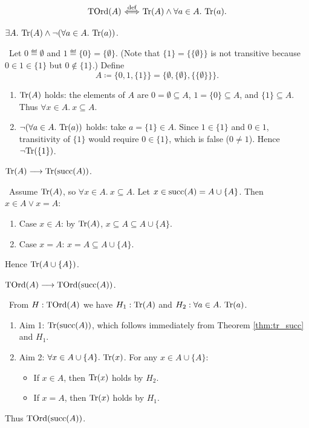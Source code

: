 \documentclass[10pt,a4paper]{article}
\begin{document}
\begin{definition}
$${\textrm{TOrd}}(A) {\stackrel{{\textrm{def}}}{\ \Longleftrightarrow\ }} {\textrm{Tr}}(A)\land \forall a\in A.\ {\textrm{Tr}}(a).$$
\end{definition}

\begin{theorem}
$\exists A.\ {\textrm{Tr}}(A) \land \neg (\forall a\in A.\ {\textrm{Tr}}(a))$.
\end{theorem}
\myprf\ Let $0 \eqdef \emptyset$ and $1 \eqdef \{0\} = \{\emptyset\}$. (Note that $\{1\} = \{\{\emptyset\}\}$ is not transitive because $0 \in 1 \in \{1\}$ but $0 \notin \{1\}$.) Define
$$A \coloneqq \{0, 1, \{1\}\} = \{\emptyset, \{\emptyset\}, \{\{\emptyset\}\}\}.$$
\begin{enumerate}
\item ${\textrm{Tr}}(A)$ holds: the elements of $A$ are $0 = \emptyset \subseteq A$, $1 = \{0\} \subseteq A$, and $\{1\} \subseteq A$. Thus $\forall x \in A.\ x \subseteq A$.
\item $\neg (\forall a \in A.\ \Tr(a))$ holds: take $a = \{1\} \in A$. Since $1 \in \{1\}$ and $0 \in 1$, transitivity of $\{1\}$ would require $0 \in \{1\}$, which is false ($0 \neq 1$). Hence $\neg {\textrm{Tr}}(\{1\})$.
\end{enumerate}
\myqed

\begin{theorem}\label{thm:tr_succ}
${\textrm{Tr}}(A) \longrightarrow {\textrm{Tr}}({\textrm{succ}}(A))$.
\end{theorem}
\myprf\ Assume ${\textrm{Tr}}(A)$, so $\forall x\in A.\ x\subseteq A$. Let $x \in {\textrm{succ}}(A) = A\cup\{A\}$. Then $x\in A \lor x=A$:
\begin{enumerate}
\item Case $x\in A$: by ${\textrm{Tr}}(A)$, $x\subseteq A \subseteq A\cup\{A\}$.
\item Case $x = A$: $x = A \subseteq A\cup\{A\}$.
\end{enumerate}
Hence ${\textrm{Tr}}(A\cup\{A\})$. \myqed

\begin{theorem}
${\textrm{TOrd}}(A) \longrightarrow {\textrm{TOrd}}({\textrm{succ}}(A))$.
\end{theorem}
\myprf\ From $H: {\textrm{TOrd}}(A)$ we have $H_1: {\textrm{Tr}}(A)$ and $H_2: \forall a\in A.\ {\textrm{Tr}}(a)$.
\begin{enumerate}
\item Aim 1: ${\textrm{Tr}}({\textrm{succ}}(A))$, which follows immediately from Theorem \ref{thm:tr_succ} and $H_1$.
\item Aim 2: $\forall x\in A\cup\{A\}.\ \Tr(x)$. For any $x \in A \cup \{A\}$:
  \begin{itemize}
  \item If $x\in A$, then ${\textrm{Tr}}(x)$ holds by $H_2$.
  \item If $x = A$, then ${\textrm{Tr}}(x)$ holds by $H_1$.
  \end{itemize}
\end{enumerate}
Thus ${\textrm{TOrd}}({\textrm{succ}}(A))$. \myqed
\end{document}
